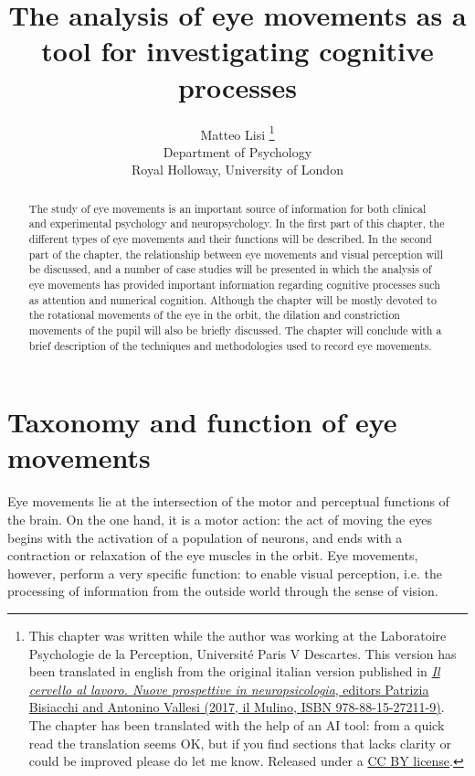 \documentclass[11pt]{article}
\title{The analysis of eye movements as a tool for investigating cognitive processes}
\author{
        Matteo Lisi \footnote{\scriptsize{This chapter was written while the author was working at the Laboratoire Psychologie de la Perception, Université Paris V Descartes. This version has been translated in english from the original italian version published in \href{https://www.mulino.it/isbn/9788815272119}{\textit{Il cervello al lavoro. Nuove prospettive in neuropsicologia}, editors Patrizia Bisiacchi and Antonino Vallesi (2017, il Mulino, ISBN 978-88-15-27211-9)}. The chapter has been translated with the help of an AI tool: from a quick read the translation seems OK, but if you find sections that lacks clarity or could be improved please do let me know. Released under a \href{https://creativecommons.org/licenses/by/2.0/}{CC BY license}.}} \\
        \small{Department of Psychology}\\
        \small{Royal Holloway, University of London}
}
\date{}
\begin{document}
\sloppy
\maketitle

\begin{abstract}
The study of eye movements is an important source of information for both clinical and experimental psychology and neuropsychology. In the first part of this chapter, the different types of eye movements and their functions will be described. In the second part of the chapter, the relationship between eye movements and visual perception will be discussed, and a number of case studies will be presented in which the analysis of eye movements has provided important information regarding cognitive processes such as attention and numerical cognition. Although the chapter will be mostly devoted to the rotational movements of the eye in the orbit, the dilation and constriction movements of the pupil will also be briefly discussed. The chapter will conclude with a brief description of the techniques and methodologies used to record eye movements.
\end{abstract}

\section{Taxonomy and function of eye movements}
Eye movements lie at the intersection of the motor and perceptual functions of the brain. On the one hand, it is a motor action: the act of moving the eyes begins with the activation of a population of neurons, and ends with a contraction or relaxation of the eye muscles in the orbit. Eye movements, however, perform a very specific function: to enable visual perception, i.e. the processing of information from the outside world through the sense of vision.
\end{document}
